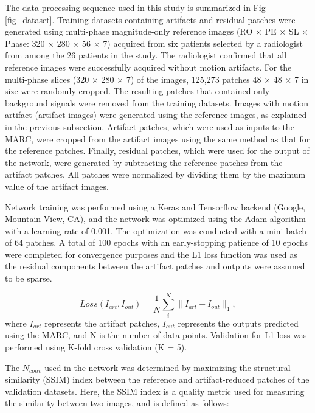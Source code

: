 \documentclass[num-refs]{wiley-article}
\begin{document}
The data processing sequence used in this study is summarized in Fig \ref{fig_dataset}. Training datasets containing artifacts and residual patches were generated using multi-phase magnitude-only reference images (RO $\times$ PE $\times$ SL $\times$ Phase: 320 $\times$ 280 $\times$ 56 $\times$ 7) acquired from six patients selected by a radiologist from among the 26 patients in the study. The radiologist confirmed that all reference images were successfully acquired without motion artifacts. For the multi-phase slices (320 $\times$ 280 $\times$ 7) of the images, 125,273 patches 48 $\times$ 48 $\times$ 7 in size were randomly cropped. The resulting patches that contained only background signals were removed from the training datasets. Images with motion artifact (artifact images) were generated using the reference images, as explained in the previous subsection. Artifact patches, which were used as inputs to the MARC, were cropped from the artifact images using the same method as that for the reference patches. Finally, residual patches, which were used for the output of the network, were generated by subtracting the reference patches from the artifact patches. All patches were normalized by dividing them by the maximum value of the artifact images.


Network training was performed using a Keras and Tensorflow backend (Google, Mountain View, CA), and the network was optimized using the Adam algorithm with a learning rate of 0.001. The optimization was conducted with a mini-batch of 64 patches. A total of 100 epochs with an early-stopping patience of 10 epochs were completed for convergence purposes and the L1 loss function was used as the residual components between the artifact patches and outputs were assumed to be sparse.

\begin{equation}
Loss(I_{art}, I_{out}) = \frac{1}{N}\sum_i^N \| I_{art} - I_{out} \|_1,
\end{equation}
where $I_{art}$ represents the artifact patches, $I_{out}$ represents the outputs predicted using the MARC, and N is the number of data points. Validation for L1 loss was performed using K-fold cross validation (K = 5).

The $N_{conv}$ used in the network was determined by maximizing the structural similarity (SSIM) index between the reference and artifact-reduced patches of the validation datasets. Here, the SSIM index is a quality metric used for measuring the similarity between two images, and is defined as follows:
\end{document}
